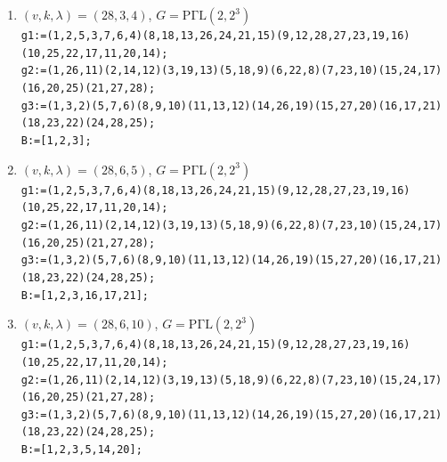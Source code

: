 \documentclass[a4paper,twopage,reqno,12pt]{amsart}
\theoremstyle{definition}
\numberwithin{equation}{section}
\newcommand{\PGaL}{\mathrm{P\Gamma L}}
\newcommand{\Aut}{\mathrm{Aut}}
\begin{document}
\begin{enumerate}
    \item\label{2834} $(v,k,\lambda)=(28,3,4)$, $G=\PGaL(2,2^3)$\\
    {\scriptsize \texttt{g1:=(1,2,5,3,7,6,4)(8,18,13,26,24,21,15)(9,12,28,27,23,19,16)(10,25,22,17,11,20,14);}\\
    \texttt{g2:=(1,26,11)(2,14,12)(3,19,13)(5,18,9)(6,22,8)(7,23,10)(15,24,17)(16,20,25)(21,27,28);}\\
    \texttt{g3:=(1,3,2)(5,7,6)(8,9,10)(11,13,12)(14,26,19)(15,27,20)(16,17,21)(18,23,22)(24,28,25);}}\\
    \texttt{B:=[1,2,3];}\\


    \item\label{2865} $(v,k,\lambda)=(28,6,5)$, $G=\PGaL(2,2^3)$\\
    {\scriptsize \texttt{g1:=(1,2,5,3,7,6,4)(8,18,13,26,24,21,15)(9,12,28,27,23,19,16)(10,25,22,17,11,20,14);}\\
    \texttt{g2:=(1,26,11)(2,14,12)(3,19,13)(5,18,9)(6,22,8)(7,23,10)(15,24,17)(16,20,25)(21,27,28);}\\
    \texttt{g3:=(1,3,2)(5,7,6)(8,9,10)(11,13,12)(14,26,19)(15,27,20)(16,17,21)(18,23,22)(24,28,25);}}\\
    \texttt{B:=[1,2,3,16,17,21];}\\

    \item\label{28610_1} $(v,k,\lambda)=(28,6,10)$, $G=\PGaL(2,2^3)$\\
    {\scriptsize \texttt{g1:=(1,2,5,3,7,6,4)(8,18,13,26,24,21,15)(9,12,28,27,23,19,16)(10,25,22,17,11,20,14);}\\
    \texttt{g2:=(1,26,11)(2,14,12)(3,19,13)(5,18,9)(6,22,8)(7,23,10)(15,24,17)(16,20,25)(21,27,28);}\\
    \texttt{g3:=(1,3,2)(5,7,6)(8,9,10)(11,13,12)(14,26,19)(15,27,20)(16,17,21)(18,23,22)(24,28,25);}}\\
    \texttt{B:=[1,2,3,5,14,20];}\\


\end{enumerate}
\end{document}
